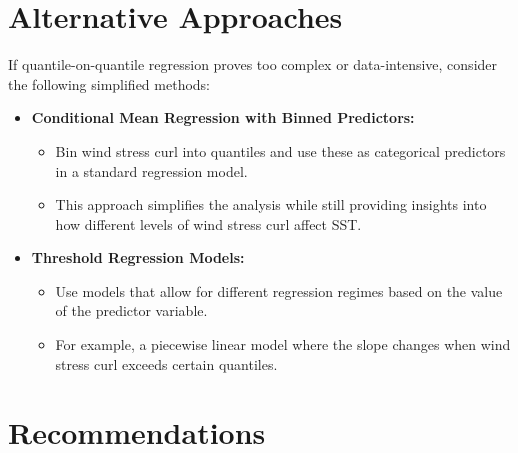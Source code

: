 \documentclass[
  letterpaper,
]{book}
\providecommand{\tightlist}{%
  \setlength{\itemsep}{0pt}\setlength{\parskip}{0pt}}\usepackage{longtable,booktabs,array}
\begin{document}
\section{Alternative Approaches}\label{alternative-approaches}

If quantile-on-quantile regression proves too complex or data-intensive,
consider the following simplified methods:

\begin{itemize}
\tightlist
\item
  \textbf{Conditional Mean Regression with Binned Predictors:}

  \begin{itemize}
  \tightlist
  \item
    Bin wind stress curl into quantiles and use these as categorical
    predictors in a standard regression model.
  \item
    This approach simplifies the analysis while still providing insights
    into how different levels of wind stress curl affect SST.
  \end{itemize}
\item
  \textbf{Threshold Regression Models:}

  \begin{itemize}
  \tightlist
  \item
    Use models that allow for different regression regimes based on the
    value of the predictor variable.
  \item
    For example, a piecewise linear model where the slope changes when
    wind stress curl exceeds certain quantiles.
  \end{itemize}
\end{itemize}

\section{Recommendations}\label{recommendations}
\end{document}
